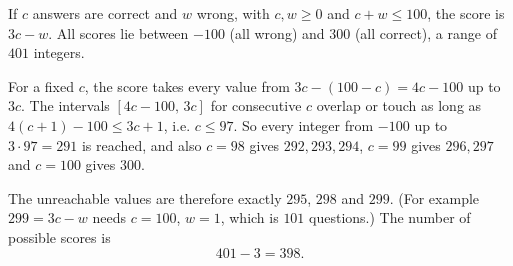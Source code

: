 If $c$ answers are correct and $w$ wrong, with $c,w\ge0$ and $c+w\le100$, the score is $3c-w$. All scores lie between $-100$ (all wrong) and $300$ (all correct), a range of $401$ integers.

For a fixed $c$, the score takes every value from $3c-(100-c)=4c-100$ up to $3c$. The intervals $[4c-100,\,3c]$ for consecutive $c$ overlap or touch as long as $4(c+1)-100\le3c+1$, i.e. $c\le97$. So every integer from $-100$ up to $3\cdot97=291$ is reached, and also $c=98$ gives $292,293,294$, $c=99$ gives $296,297$ and $c=100$ gives $300$.

The unreachable values are therefore exactly $295$, $298$ and $299$. (For example $299=3c-w$ needs $c=100$, $w=1$, which is $101$ questions.) The number of possible scores is
\[
401-3=\boxed{398}.
\]
